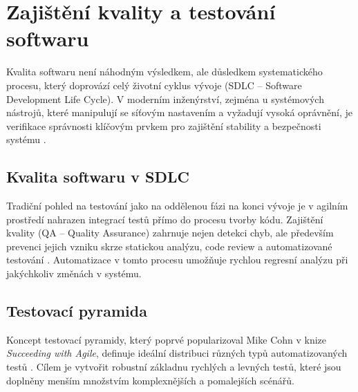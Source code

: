 \section{Zajištění kvality a testování softwaru}
\label{sec:testovani_teorie}
Kvalita softwaru není náhodným výsledkem, ale důsledkem systematického procesu, který doprovází celý životní cyklus vývoje (SDLC – Software Development Life Cycle). V moderním inženýrství, zejména u systémových nástrojů, které manipulují se síťovým nastavením a vyžadují vysoká oprávnění, je verifikace správnosti klíčovým prvkem pro zajištění stability a bezpečnosti systému \cite{sommerville_se}.

\subsection{Kvalita softwaru v SDLC}
Tradiční pohled na testování jako na oddělenou fázi na konci vývoje je v agilním prostředí nahrazen integrací testů přímo do procesu tvorby kódu. Zajištění kvality (QA – Quality Assurance) zahrnuje nejen detekci chyb, ale především prevenci jejich vzniku skrze statickou analýzu, code review a automatizované testování \cite{cohn_succeeding}. Automatizace v tomto procesu umožňuje rychlou regresní analýzu při jakýchkoliv změnách v systému.

\subsection{Testovací pyramida}
\label{sec:test_pyramida_teorie}
Koncept testovací pyramidy, který poprvé popularizoval Mike Cohn v knize \textit{Succeeding with Agile}, definuje ideální distribuci různých typů automatizovaných testů \cite{cohn_succeeding}. Cílem je vytvořit robustní základnu rychlých a levných testů, které jsou doplněny menším množstvím komplexnějších a pomalejších scénářů.

